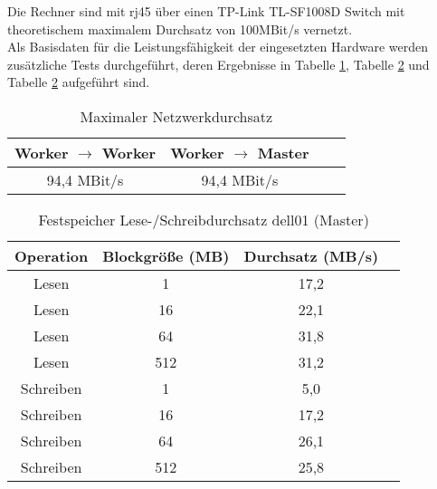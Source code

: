 Die Rechner sind mit \gls{rj45} über einen TP-Link TL-SF1008D Switch mit theoretischem maximalem Durchsatz von 100MBit/s vernetzt.\\

Als Basisdaten für die Leistungsfähigkeit der eingesetzten Hardware werden zusätzliche Tests durchgeführt, deren Ergebnisse in Tabelle \ref{table:network}, Tabelle \ref{table:master_harddrive} und Tabelle \ref{table:master_harddrive} aufgeführt sind.

\begin{table}[ht]
	\centering %
	\begin{tabular}{c c c c} %
	\hline\hline %
	Worker $\rightarrow$ Worker & Worker $\rightarrow$ Master \\ [0.5ex] %
	\hline %
	94,4 MBit/s & 94,4 MBit/s\\ [1ex] 
	\hline %
	\end{tabular}
	\caption{Maximaler Netzwerkdurchsatz{\protect\footnotemark}} %
	\label{table:network} %
\end{table}

\begin{table}[ht]
	\centering %
	\begin{tabular}{c c c c} %
	\hline\hline %
	Operation & Blockgröße (MB) & Durchsatz (MB/s) \\ [0.5ex] %
	\hline %
	Lesen & 1 & 17,2 \\ 
	Lesen & 16 & 22,1 \\
	Lesen & 64 & 31,8 \\
	Lesen & 512 & 31,2 \\
	Schreiben & 1 & 5,0 \\
	Schreiben & 16 & 17,2 \\
	Schreiben & 64 & 26,1 \\
	Schreiben & 512 & 25,8 \\[1ex] 
	\hline %
	\end{tabular}
	\caption{Festspeicher Lese-/Schreibdurchsatz dell01 (Master){\protect\footnotemark}} %
	\label{table:master_harddrive} %
\end{table}

